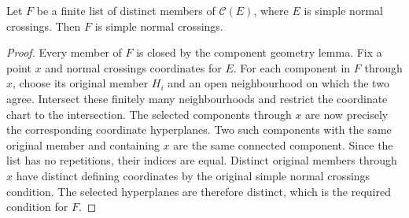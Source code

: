 \begin{lemma}
\label{hir:snc-connected-component-refinement}
\leanok
Let \(F\) be a finite list of distinct members of \(\mathcal C(E)\), where
\(E\) is simple normal crossings. Then \(F\) is simple normal crossings.
\end{lemma}
\begin{proof}
Every member of \(F\) is closed by the component geometry lemma. Fix a point
\(x\) and normal crossings coordinates for \(E\). For each component in
\(F\) through \(x\), choose its original member \(H_i\) and an open
neighbourhood on which the two agree. Intersect these finitely many
neighbourhoods and restrict the coordinate chart to the intersection. The
selected components through \(x\) are now precisely the corresponding
coordinate hyperplanes. Two such components with the same original member
and containing \(x\) are the same connected component. Since the list has no
repetitions, their indices are equal. Distinct original members through
\(x\) have distinct defining coordinates by the original simple normal
crossings condition. The selected hyperplanes are therefore distinct, which
is the required condition for \(F\).
\end{proof}

